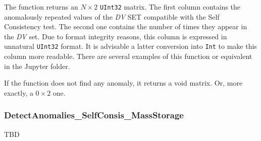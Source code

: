 \begin{itemize}
\begin{itemize}
	\end{itemize}
	
	The function returns an \(N\times 2\) \texttt{UInt32} matrix. The first column contains the anomalously repeated values of the \textit{DV} SET compatible with the Self Consistency test. The second one contains the number of times they appear in the \textit{DV} set. Due to format integrity reasons, this column is expressed in unnatural \texttt{UInt32} format. It is advisable a latter conversion into \texttt{Int} to make this column more readable. There are several examples of this function or equivalent in the Jupyter folder.
	
	If the function does not find any anomaly, it returns a void matrix.  Or, more exactly, a \(0\times 2\) one.
\end{itemize}
%
\subsubsection*{DetectAnomalies\_SelfConsis\_MassStorage}\label{Fun:DetectAnomaliesSelfConsis_MassStorage}
%
TBD
%
